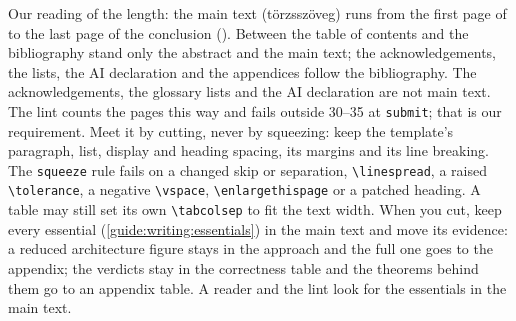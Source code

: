 Our reading of the length: the main text (törzsszöveg) runs from the first page of  to the last page of the conclusion (). Between the table of contents and the bibliography stand only the abstract and the main text; the acknowledgements, the lists, the AI declaration and the appendices follow the bibliography. The acknowledgements, the glossary lists and the AI declaration are not main text. The lint counts the pages this way and fails outside 30--35 at \texttt{submit}; that is our requirement. Meet it by cutting, never by squeezing: keep the template's paragraph, list, display and heading spacing, its margins and its line breaking. The \texttt{squeeze} rule fails on a changed skip or separation, \texttt{\textbackslash linespread}, a raised \texttt{\textbackslash tolerance}, a negative \texttt{\textbackslash vspace}, \texttt{\textbackslash enlargethispage} or a patched heading. A table may still set its own \texttt{\textbackslash tabcolsep} to fit the text width. When you cut, keep every essential (\cref{guide:writing:essentials}) in the main text and move its evidence: a reduced architecture figure stays in the approach and the full one goes to the appendix; the verdicts stay in the correctness table and the theorems behind them go to an appendix table. A reader and the lint look for the essentials in the main text.

